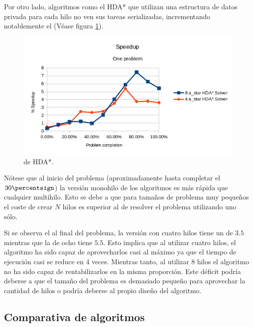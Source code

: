Por otro lado, algoritmos como el HDA*
que utilizan una estructura de datos privada para cada hilo
no ven sus tareas serializadas,
incrementando notablemente el 
(Véase figura \ref{fig:ParalelismoHDA}).

\begin{figure}[h]
    \begin{center}
        \includegraphics[width=\textwidth]{Media/Ch2/Speedup_One_Problem.png}
    \end{center}
    \caption{ de HDA*.}
    \label{fig:ParalelismoHDA}
\end{figure}

Nótese que al inicio del problema (aproximadamente hasta completar el $30\percentsign$)
la versión monohilo de los algoritmos es más rápida que cualquier multihilo.
Esto se debe a que para tamaños de problema muy pequeños
el coste de crear $N$ hilos es superior al de resolver el problema
utilizando uno sólo.

Si se observa el  al final del problema,
la versión con cuatro hilos tiene un 
de $3.5$ mientras que la de ocho tiene $5.5$.
Esto implica que al utilizar cuatro hilos,
el algoritmo ha sido capaz de aprovecharlos casi al máximo
ya que el tiempo de ejecución casi se reduce en 4
veces.
Mientras tanto, al utilizar 8 hilos el algoritmo
no ha sido capaz de rentabilizarlos en la misma proporción.
Este déficit podría deberse a que el tamaño del problema
es demasiado pequeño para aprovechar la cantidad de hilos
o podría deberse al propio diseño del algoritmo.

\subsection{Comparativa de algoritmos}

